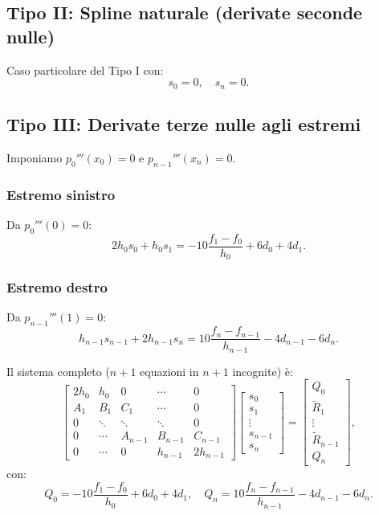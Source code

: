 \documentclass[12pt]{article}
\begin{document}
\subsection{Tipo II: Spline naturale (derivate seconde nulle)}
Caso particolare del Tipo I con:
\[
s_0 = 0, \quad s_n = 0.
\]

\subsection{Tipo III: Derivate terze nulle agli estremi}
Imponiamo $p_0'''(x_0) = 0$ e $p_{n-1}'''(x_n) = 0$.

\subsubsection{Estremo sinistro}
Da $p_0'''(0) = 0$:
\[
2h_0 s_0 + h_0 s_1 = -10\frac{f_1 - f_0}{h_0} + 6d_0 + 4d_1.
\]

\subsubsection{Estremo destro}
Da $p_{n-1}'''(1) = 0$:
\[
h_{n-1} s_{n-1} + 2h_{n-1} s_n = 10\frac{f_n - f_{n-1}}{h_{n-1}} - 4d_{n-1} - 6d_n.
\]

Il sistema completo ($n+1$ equazioni in $n+1$ incognite) è:
\[
\begin{bmatrix}
2h_0 & h_0 & 0 & \cdots & 0 \\
A_1 & B_1 & C_1 & \cdots & 0 \\
0 & \ddots & \ddots & \ddots & 0 \\
0 & \cdots & A_{n-1} & B_{n-1} & C_{n-1} \\
0 & \cdots & 0 & h_{n-1} & 2h_{n-1}
\end{bmatrix}
\begin{bmatrix}
s_0 \\ s_1 \\ \vdots \\ s_{n-1} \\ s_n
\end{bmatrix}
=
\begin{bmatrix}
Q_0 \\ \tilde{R}_1 \\ \vdots \\ \tilde{R}_{n-1} \\ Q_n
\end{bmatrix},
\]
con:
\[
Q_0 = -10\frac{f_1 - f_0}{h_0} + 6d_0 + 4d_1, \quad Q_n = 10\frac{f_n - f_{n-1}}{h_{n-1}} - 4d_{n-1} - 6d_n.
\]
\end{document}
